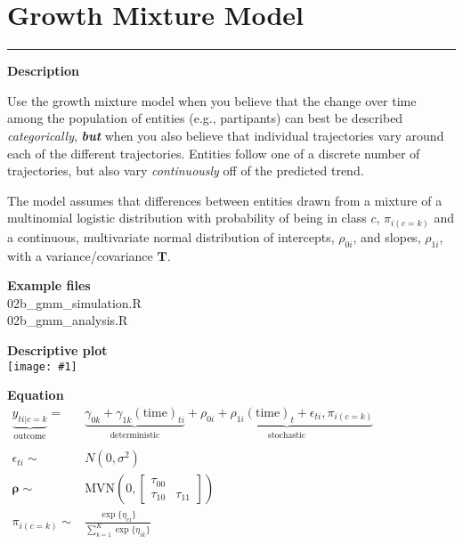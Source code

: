 \documentclass[10pt, landscape, article]{memoir}
\newcommand{\outcome}[1]{\underbrace{#1}_{\text{outcome}}}
\newcommand{\deterministic}[1]{\underbrace{#1}_{\text{deterministic}}}
\newcommand{\stochastic}[1]{\underbrace{#1}_{\text{stochastic}}}
\newenvironment{desc}{
    \begin{minipage}[t][.6\textheight][t]{.9\textwidth}
    \setlength{\parskip}{.5\baselineskip}
    \textbf{\large Description}\\\raggedright
}{
    \end{minipage}
}
\newenvironment{eqn}{
    \begin{minipage}[t][.39\textheight][t]{\textwidth}
    \textbf{\large Equation}\\
}{
    \end{minipage}
}
\newcommand{\datafig}[1]{
    \begin{minipage}[t][.6\textheight][t]{\textwidth}%
    \textbf{\large Descriptive plot}\\
    \texttt{[image: \#1]}%
    \end{minipage}
}
\newenvironment{files}{
    \begin{minipage}[t][.2\textheight][t]{\textwidth}
    \textbf{\large Example files}\\
}{
    \end{minipage}
}
\begin{document}
\chapter{Growth Mixture Model}
\label{gmm}
\rule[\baselineskip]{\textwidth}{3pt}
\begin{minipage}[t][.9\textheight][t]{.4\textwidth}
\begin{desc}
Use the growth mixture model when you believe that the change over time among the population of entities (e.g., partipants) can best be described \emph{categorically}, \emph{\textbf{but}} when you also believe that individual trajectories vary around each of the different trajectories. Entities follow one of a discrete number of trajectories, but also vary \emph{continuously} off of the predicted trend. 

The model assumes that differences between entities drawn from a mixture of a multinomial logistic distribution with probability of being in class $c$, $\pi_{i(c{=}k)}$ and a continuous, multivariate normal distribution of intercepts, $\rho_{0i}$, and slopes, $\rho_{1i}$, with a variance\slash covariance $\mathbf{T}$.
\end{desc}
\begin{files}
02b\_gmm\_simulation.R\\02b\_gmm\_analysis.R
\end{files}
\end{minipage} %
\begin{minipage}[t][.9\textheight][t]{.6\textwidth}
\datafig{gmm.pdf}
\begin{eqn}
$\begin{array}{rl}
\outcome{y_{ti|c=k}} =& 
\deterministic{\gamma_{0k} + \gamma_{1k}(\text{time})_{ti}} +
\stochastic{\rho_{0i}  + \rho_{1i}(\text{time})_{t} + \epsilon_{ti}, \pi_{i(c=k)}} \\
& \\
\epsilon_{ti} \sim& N(0, \sigma^2) \\ 
\mathbf{\rho} \sim& \text{MVN}\left(0, \begin{bmatrix}\tau_{00} & \\ \tau_{10} & \tau_{11}\end{bmatrix}\right)\\ 
\pi_{i(c=k)} \sim& \frac{\exp\{\eta_{ci}\}}{\sum^K_{k=1}\exp\{\eta_{ik}\}}
\end{array}$
\end{eqn}
\end{minipage}
\newpage
\end{document}
